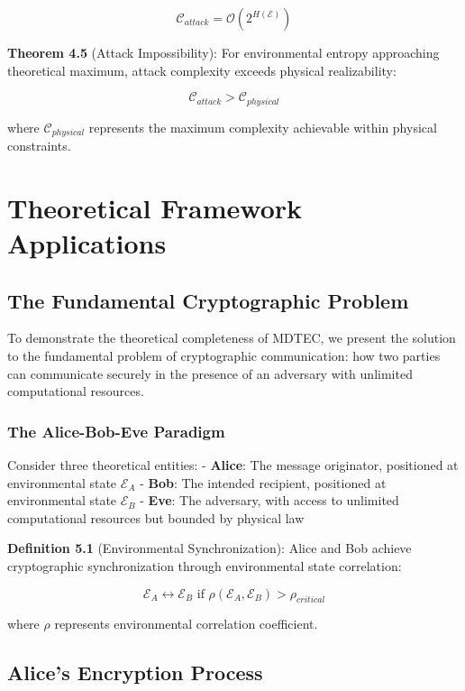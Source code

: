 \documentclass[12pt]{article}
\begin{document}
$$\mathcal{C}_{attack} = \mathcal{O}(2^{H(\mathcal{E})})$$

\textbf{Theorem 4.5} (Attack Impossibility): For environmental entropy approaching theoretical maximum, attack complexity exceeds physical realizability:

$$\mathcal{C}_{attack} > \mathcal{C}_{physical}$$

where $\mathcal{C}_{physical}$ represents the maximum complexity achievable within physical constraints.

\section{Theoretical Framework Applications}

\subsection{The Fundamental Cryptographic Problem}

To demonstrate the theoretical completeness of MDTEC, we present the solution to the fundamental problem of cryptographic communication: how two parties can communicate securely in the presence of an adversary with unlimited computational resources.

\subsubsection{The Alice-Bob-Eve Paradigm}

Consider three theoretical entities:
- \textbf{Alice}: The message originator, positioned at environmental state $\mathcal{E}_A$
- \textbf{Bob}: The intended recipient, positioned at environmental state $\mathcal{E}_B$
- \textbf{Eve}: The adversary, with access to unlimited computational resources but bounded by physical law

\textbf{Definition 5.1} (Environmental Synchronization): Alice and Bob achieve cryptographic synchronization through environmental state correlation:

$$\mathcal{E}_A \leftrightarrow \mathcal{E}_B \text{ if } \rho(\mathcal{E}_A, \mathcal{E}_B) > \rho_{critical}$$

where $\rho$ represents environmental correlation coefficient.

\subsection{Alice's Encryption Process}
\end{document}

